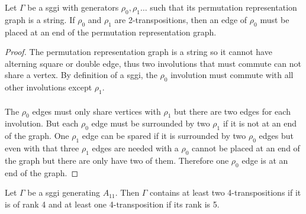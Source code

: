 \begin{lemma}\label{rho0atEnd}
  Let $\Gamma$ be a sggi with generators $\rho_0, \rho_1 \dots$ such that its permutation representation graph is a string. If $\rho_0$ and $\rho_1$ are 2-transpositions, then an edge of $\rho_0$ must be placed at an end of the permutation representation graph.
\end{lemma}

\begin{proof}
  The permutation representation graph is a string so it cannot have alterning square or double edge, thus two involutions that must commute can not share a vertex. By definition of a sggi, the $\rho_0$ involution must commute with all other involutions except $\rho_1$.

  \paragraph{}
  The $\rho_0$ edges must only share vertices with $\rho_1$ but there are two edges for each involution. But each $\rho_0$ edge must be surrounded by two $\rho_1$ if it is not at an end of the graph. One $\rho_1$ edge can be spared if it is surrounded by two $\rho_0$ edges but even with that three $\rho_1$ edges are needed with a $\rho_0$ cannot be placed at an end of the graph but there are only have two of them. Therefore one $\rho_0$ edge is at an end of the graph.
\end{proof}

\begin{lemma}
  Let $\Gamma$ be a sggi generating $A_{11}$. Then $\Gamma$ contains at least two 4-transpositions if it is of rank 4 and at least one 4-transposition if its rank is 5.
\end{lemma}

